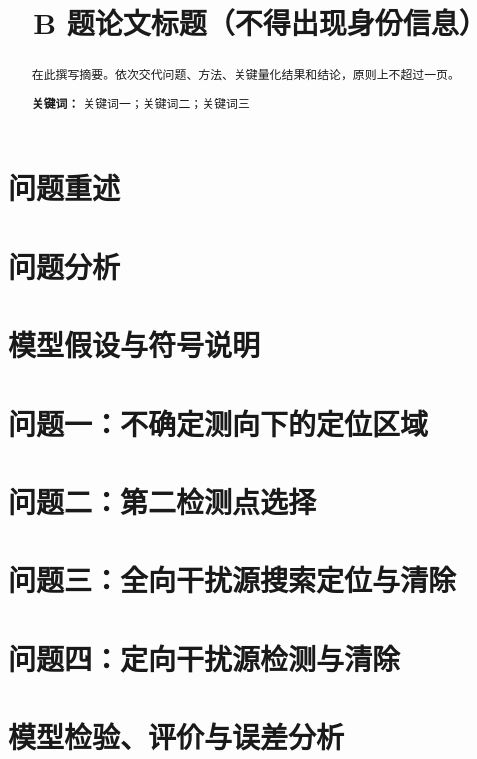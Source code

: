 \documentclass[UTF8,zihao=-4]{ctexart}
\title{B 题论文标题（不得出现身份信息）}
\author{}
\date{}
\begin{document}
\maketitle
\vspace{-2.5em}
\begin{abstract}
在此撰写摘要。依次交代问题、方法、关键量化结果和结论，原则上不超过一页。

\textbf{关键词：} 关键词一；关键词二；关键词三
\end{abstract}
\thispagestyle{plain}
\clearpage

\section{问题重述}


\section{问题分析}


\section{模型假设与符号说明}


\section{问题一：不确定测向下的定位区域}


\section{问题二：第二检测点选择}


\section{问题三：全向干扰源搜索定位与清除}


\section{问题四：定向干扰源检测与清除}


\section{模型检验、评价与误差分析}

\end{document}
